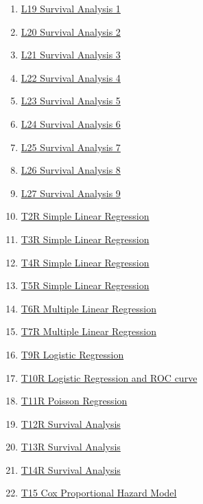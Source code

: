 \documentclass[11pt]{article}
\begin{document}
\begin{multicols}{2}
\begin{enumerate}
		\item \href{https://mp.weixin.qq.com/s/h097IZjtDvQ_JnOOV1A4HQ}{L19 Survival Analysis 1}	%
		\item \href{https://mp.weixin.qq.com/s/5vzxpwUKPr9Jk3Cef7L-hw}{L20 Survival Analysis 2}	%
		\item \href{https://mp.weixin.qq.com/s/yELMSbwn5dDoV_vqt8onEA}{L21 Survival Analysis 3}	%
		\item \href{https://mp.weixin.qq.com/s/VmUhzuf7SVCLnW-txe97Og}{L22 Survival Analysis 4}	%
		\item \href{https://mp.weixin.qq.com/s/0tqI2rrGhEMZU3AFeHSIfg}{L23 Survival Analysis 5}	%
		\item \href{https://mp.weixin.qq.com/s/nMm_1wfwkX3U_rgBgxFcQg}{L24 Survival Analysis 6}	%
		\item \href{https://mp.weixin.qq.com/s/eptiMLUbVGJ1omD01ePO4w}{L25 Survival Analysis 7}	%
		\item \href{https://mp.weixin.qq.com/s/cSXrLtfS5Gtb2QlvCkokbA}{L26 Survival Analysis 8}	%
		\item \href{https://mp.weixin.qq.com/s/oqb38Zrba-aSSnJd2xvG5g}{L27 Survival Analysis 9}	%
		\item \href{https://mp.weixin.qq.com/s/Wzsprh20B17fzY1msStCYQ}{T2R Simple Linear Regression}	%
		\item \href{https://mp.weixin.qq.com/s/KX1tPnz9148McLb3ZfcgAQ}{T3R Simple Linear Regression}	%
		\item \href{https://mp.weixin.qq.com/s/Ax-EtdoPvCap9euJyTJmuQ}{T4R Simple Linear Regression}	%
		\item \href{https://mp.weixin.qq.com/s/7qHvtNKwMi2DsFHMpLGglg}{T5R Simple Linear Regression}	%
		\item \href{https://mp.weixin.qq.com/s/CoB_qBXeJtUQ6xipFMsFLw}{T6R Multiple Linear Regression}	%
		\item \href{https://mp.weixin.qq.com/s/YFdgWBb0QV4VSiAiwQ8KaA}{T7R Multiple Linear Regression}	%
		\item \href{https://mp.weixin.qq.com/s/uvdDE1gtEp4lVx4J9lDuCA}{T9R Logistic Regression}	%
		\item \href{https://mp.weixin.qq.com/s/yycWVyIh3ZCcBlM9Ak0Jcw}{T10R Logistic Regression and ROC curve}	%
		\item \href{https://mp.weixin.qq.com/s/OvZYIUBmKJdjtrtNUC69wQ}{T11R Poisson Regression}	%
		\item \href{https://mp.weixin.qq.com/s/P5SNGFStW_Rrd9VI74TJ2g}{T12R Survival Analysis}	%
		\item \href{https://mp.weixin.qq.com/s/vUqCX6dF-hfxfb3ACN8HmQ}{T13R Survival Analysis}	%
		\item \href{https://mp.weixin.qq.com/s/_N6vKJ9iow_RudH4pSzqgQ}{T14R Survival Analysis}	%
		\item \href{https://mp.weixin.qq.com/s/3YeBrXENUrwHcV-m3gUvyw}{T15 Cox Proportional Hazard Model}	%
	\end{enumerate}
\end{multicols}
\end{document}
